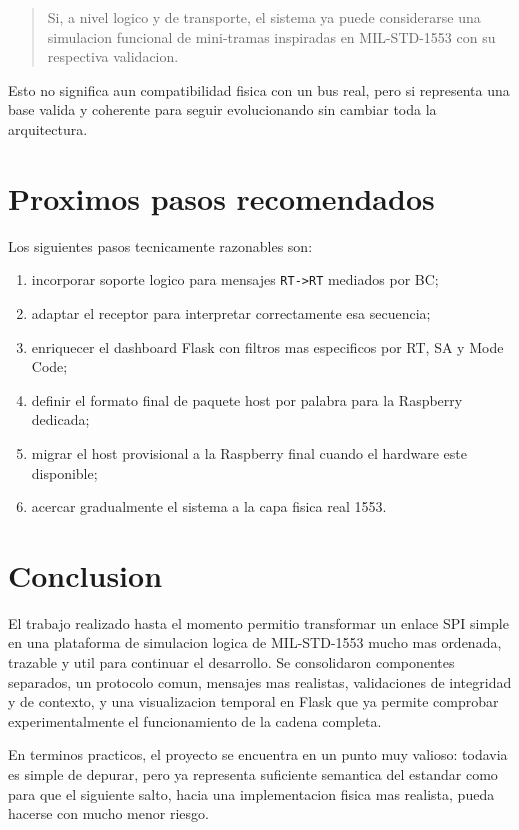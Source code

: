 \documentclass[12pt,a4paper]{article}
\begin{document}
\begin{quote}
Si, a nivel logico y de transporte, el sistema ya puede considerarse una simulacion funcional de
mini-tramas inspiradas en MIL-STD-1553 con su respectiva validacion.
\end{quote}

Esto no significa aun compatibilidad fisica con un bus real, pero si representa una base valida y
coherente para seguir evolucionando sin cambiar toda la arquitectura.

\section{Proximos pasos recomendados}

Los siguientes pasos tecnicamente razonables son:

\begin{enumerate}
    \item incorporar soporte logico para mensajes \texttt{RT->RT} mediados por BC;
    \item adaptar el receptor para interpretar correctamente esa secuencia;
    \item enriquecer el dashboard Flask con filtros mas especificos por RT, SA y Mode Code;
    \item definir el formato final de paquete host por palabra para la Raspberry dedicada;
    \item migrar el host provisional a la Raspberry final cuando el hardware este disponible;
    \item acercar gradualmente el sistema a la capa fisica real 1553.
\end{enumerate}

\section{Conclusion}

El trabajo realizado hasta el momento permitio transformar un enlace SPI simple en una plataforma
de simulacion logica de MIL-STD-1553 mucho mas ordenada, trazable y util para continuar el
desarrollo. Se consolidaron componentes separados, un protocolo comun, mensajes mas realistas,
validaciones de integridad y de contexto, y una visualizacion temporal en Flask que ya permite
comprobar experimentalmente el funcionamiento de la cadena completa.

En terminos practicos, el proyecto se encuentra en un punto muy valioso: todavia es simple de
depurar, pero ya representa suficiente semantica del estandar como para que el siguiente salto,
hacia una implementacion fisica mas realista, pueda hacerse con mucho menor riesgo.
\end{document}

